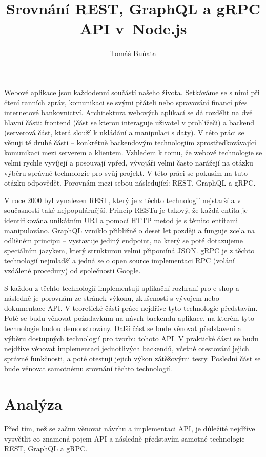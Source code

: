 \documentclass[thesis=M,czech]{FITthesis}[2019/12/23]
\title{Srovnání REST, GraphQL a gRPC API v~Node.js}
\author{Tomáš Buňata} %
\begin{document}

\begin{introduction}
Webové aplikace jsou každodenní součástí našeho života. Setkáváme se s nimi při čtení ranních zpráv, komunikaci se svými přáteli nebo spravování financí přes internetové bankovnictví.
Architektura webových aplikací se dá rozdělit na dvě hlavní části: frontend (část se kterou interaguje uživatel v prohlížeči) a backend (serverová část, která slouží k ukládání a manipulaci s daty). V této práci se věnuji té druhé části -- konkrétně backendovým technologiím zprostředkovávající komunikaci mezi serverem a klientem.
Vzhledem k tomu, že webové technologie se velmi rychle vyvíjejí a posouvají vpřed, vývojáři velmi často narážejí na otázku výběru správné technologie pro svůj projekt. V této práci se pokusím na tuto otázku odpovědět. Porovnám mezi sebou následující: REST, GraphQL a gRPC.

V roce 2000 byl vynalezen REST, který je z těchto technologií nejstarší a v současnosti také nejpopulárnější. Princip RESTu je takový, že každá entita je identifikována unikátním URI a pomocí HTTP metod je s těmito entitami manipulováno.
GraphQL vzniklo přibližně o deset let později a funguje zcela na odlišném principu -- vystavuje jediný endpoint, na který se poté dotazujeme speciálním jazykem, který strukturou velmi připomíná JSON.
gRPC je z těchto technologií nejmladší a jedná se o open source implementaci RPC (volání vzdálené procedury) od společnosti Google.

S každou z těchto technologií implementuji aplikační rozhraní pro e-shop a následně je porovnám ze stránek výkonu, zkušenosti s vývojem nebo dokumentace API.
V teoretické části práce nejdříve tyto technologie představím. Poté se budu věnovat požadavkům na návrh backendu aplikace, na kterém tyto technologie budou demonstrovány. Další část se bude věnovat představení a výběru dostupných technologií pro tvorbu tohoto API.
V praktické části se budu nejdříve věnovat implementaci jednotlivých backendů, včetně otestování jejich správné funkčnosti, a poté otestuji jejich výkon zátěžovými testy. Poslední část se bude věnovat samotnému srovnání těchto technologií.

\end{introduction}

\chapter{Analýza}
Před tím, než se začnu věnovat návrhu a implementaci API, je důležité nejdříve vysvětlit co znamená pojem API a následně představím samotné technologie REST, GraphQL a gRPC.
\end{document}
